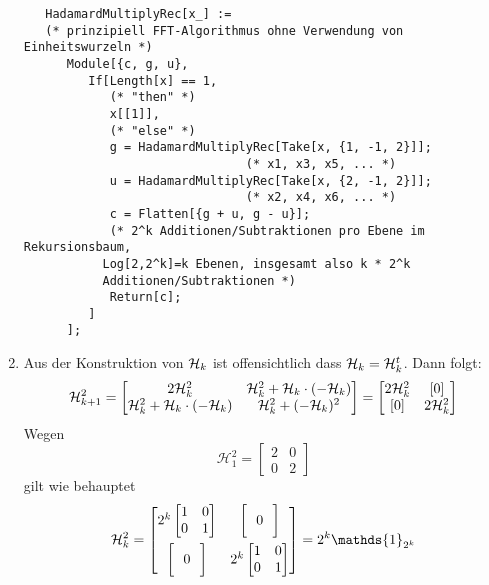 \begin{enumerate}
\begin{lstlisting}
   HadamardMultiplyRec[x_] :=
   (* prinzipiell FFT-Algorithmus ohne Verwendung von Einheitswurzeln *)
      Module[{c, g, u},
         If[Length[x] == 1,
            (* "then" *)
            x[[1]],
            (* "else" *)
            g = HadamardMultiplyRec[Take[x, {1, -1, 2}]];
	                           (* x1, x3, x5, ... *)
            u = HadamardMultiplyRec[Take[x, {2, -1, 2}]];
	                           (* x2, x4, x6, ... *)
            c = Flatten[{g + u, g - u}];
            (* 2^k Additionen/Subtraktionen pro Ebene im Rekursionsbaum, 
	       Log[2,2^k]=k Ebenen, insgesamt also k * 2^k 
	       Additionen/Subtraktionen *)
            Return[c];
         ]
      ];
	\end{lstlisting}
\item
	Aus der Konstruktion von $\mathcal{H}_{k}$ ist offensichtlich dass
	$\mathcal{H}_{k} = \mathcal{H}_{k}^{t}$. Dann folgt:
	\[ \mathcal{H}_{k+1}^{2} = \begin{bmatrix}2\mathcal{H}_{k}^{2} & \mathcal{H}_{k}^{2} + \mathcal{H}_{k}\cdot(-\mathcal{H}_{k}) \\
	\mathcal{H}_{k}^{2} + \mathcal{H}_{k}\cdot(-\mathcal{H}_{k}) & \mathcal{H}_{k}^{2} + (-\mathcal{H}_{k})^{2}\end{bmatrix} =
	\begin{bmatrix}2\mathcal{H}_{k}^{2} & [0] \\ [0] & 2\mathcal{H}_{k}^{2}\end{bmatrix} \]
	Wegen
	\[ \mathcal{H}_{1}^{2} = \begin{bmatrix}2&0\\0&2\end{bmatrix} \]
	gilt wie behauptet
	\[ \hk^{2} = \begin{bmatrix}2^{k}\begin{bmatrix}1&0\\0&1\end{bmatrix} &
	\bigg[\ \  0\ \ \bigg] \\[1.0em] \bigg[\ \ 0\ \ \bigg] & 2^{k}\begin{bmatrix}1&0\\0&1\end{bmatrix}\end{bmatrix} = 2^{k}
	\mathds{1}_{2^{k}}\]
\end{enumerate}
